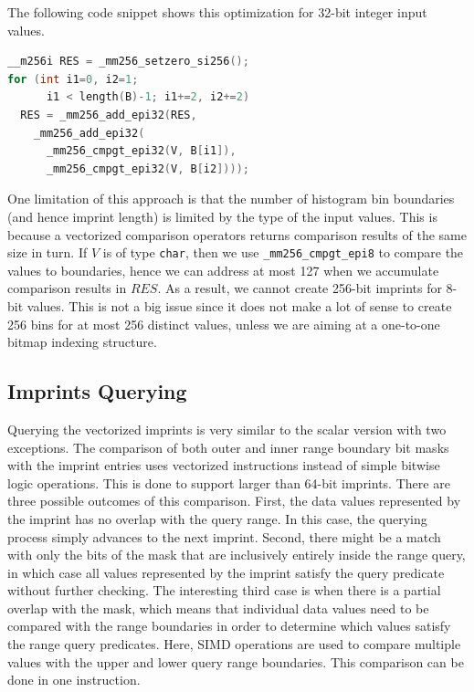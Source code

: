 \documentclass[sigconf]{acmart}
\begin{document}
The following code snippet shows this optimization for 32-bit integer input values.

\begin{lstlisting}[language=c]
__m256i RES = _mm256_setzero_si256();
for (int i1=0, i2=1;
      i1 < length(B)-1; i1+=2, i2+=2) 
  RES = _mm256_add_epi32(RES, 
    _mm256_add_epi32(
      _mm256_cmpgt_epi32(V, B[i1]),
      _mm256_cmpgt_epi32(V, B[i2])));		
\end{lstlisting}

One limitation of this approach is that the number of histogram bin boundaries (and hence imprint length) is limited by the type of the input 
values. This is because a vectorized comparison operators returns comparison results of the same size in turn. If $V$ is of type
\texttt{char}, then we use \texttt{\_mm256\_cmpgt\_epi8} to compare the values to boundaries, hence we can address at most 127 when we accumulate
comparison results in $RES$. As a result, we cannot create 256-bit imprints for 8-bit values. This is not a big issue since it does not
make a lot of sense to create 256 bins for at most 256 distinct values, unless we are aiming at a one-to-one bitmap indexing structure.

\subsection{Imprints Querying}

Querying the vectorized imprints is very similar to the scalar version with two exceptions. The comparison of both outer and inner range boundary 
bit masks with the imprint entries uses vectorized instructions instead of simple bitwise logic operations. This is done to support larger
than 64-bit imprints. There are three possible outcomes of this comparison. First, the data values represented by the imprint has no overlap with 
the query range. In this case, the querying process simply advances to the next imprint. Second, there might be a match with only the bits of the
mask that are inclusively entirely inside the range query, in which case all values represented by the imprint satisfy the query predicate without
further checking. The interesting third case is when there is a partial overlap with the mask, which means that individual data values need to be 
compared with the range boundaries in order to determine which values satisfy the range query predicates. Here, SIMD operations are used to compare 
multiple values with the upper and lower query range boundaries. This comparison can be done in one instruction.
\end{document}
